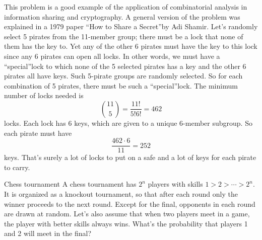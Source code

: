 \begin{solution}
This problem is a good example of the application of combinatorial analysis in information
sharing and cryptography. A general version of the problem was explained in a 1979 paper
\textquotedblleft How to Share a Secret\textquotedblright by Adi Shamir. Let's randomly select
5 pirates from the 11-member group; there must be a lock that none of them has the key to.
Yet any of the other 6 pirates must have the key to this lock since any 6 pirates can open
all locks. In other words, we must have a \textquotedblleft special\textquotedblright lock to
which none of the 5 selected pirates has a key and the other 6 pirates all have keys. Such
5-pirate groups are randomly selected. So for each combination of 5 pirates, there must be
such a \textquotedblleft special\textquotedblright lock. The minimum number of locks needed
is
\[
\binom{11}{5}=\frac{11!}{5!6!}=462
\]
locks. Each lock has 6 keys, which are given to a unique 6-member subgroup. So each pirate
must have
\[
\frac{462\cdot6}{11}=252
\]
keys. That's surely a lot of locks to put on a safe and a lot of keys for each pirate to
carry.
\end{solution}


\begin{problem}{Chess tournament}
A chess tournament has $2^n$ players with skills $1>2>\cdots>2^n$. It is organized as a
knockout tournament, so that after each round only the winner proceeds to the next round.
Except for the final, opponents in each round are drawn at random. Let's also assume that
when two players meet in a game, the player with better skills always wins. What's the
probability that players 1 and 2 will meet in the final?\footnotemark[8]
\end{problem}

